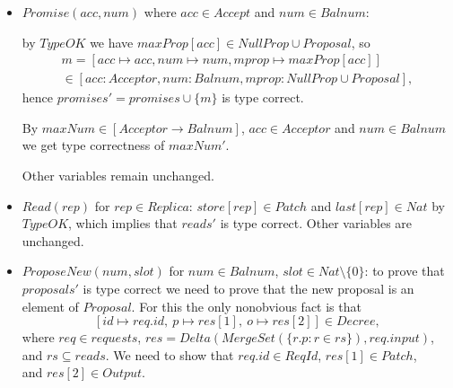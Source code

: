 \documentclass[12pt,a4paper,en]{pracamgr}
\begin{document}
\begin{itemize}
    \item $Promise(acc, num)$ where $acc \in Accept$ and $num \in Balnum$:

        by $TypeOK$ we have $maxProp[acc] \in NullProp \cup Proposal$, so
        \begin{multline*}
        m = [acc \mapsto acc, num \mapsto num, mprop \mapsto maxProp[acc]]\\
        \in [acc: Acceptor, num: Balnum, mprop: NullProp \cup Proposal],
        \end{multline*}
        hence $promises' = promises \cup \{m\}$ is type correct.

        By $maxNum \in [Acceptor \rightarrow Balnum]$, $acc \in Acceptor$ and $num \in Balnum$ we get type correctness of $maxNum'$.

        Other variables remain unchanged.
    \item $Read(rep)$ for $rep \in Replica$: $store[rep] \in Patch$ and $last[rep] \in Nat$ by $TypeOK$,
        which implies that $reads'$ is type correct. Other variables are unchanged.
    \item $ProposeNew(num, slot)$ for $num \in Balnum$, $slot \in Nat \setminus \{0\}$: to prove that $proposals'$ is type correct we need to prove that the new proposal is an element of $Proposal$. For this the only nonobvious fact is that
        $$ [id \mapsto req.id,\ p \mapsto res[1],\ o \mapsto res[2]] \in Decree, $$
        where $req \in requests$, $res = Delta(MergeSet(\{r.p: r \in rs\}), req.input)$, and $rs \subseteq reads$. We need to show that $req.id \in ReqId$, $res[1] \in Patch$,\\
        and $res[2] \in Output$.


\end{itemize}
\end{document}
